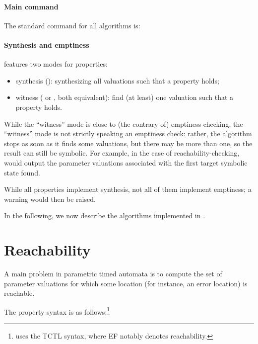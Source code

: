 \paragraph{Main command}
The standard \imitator{} command for all algorithms is:


\paragraph{Synthesis and emptiness}
\imitator{} features two modes for properties:

\begin{itemize}
	\item synthesis (): synthesizing all valuations such that a property holds;
	\item witness ( or , both equivalent): find (at least) one valuation such that a property holds.
\end{itemize}

While the ``witness'' mode is close to (the contrary of) emptiness-checking, the ``witness'' mode is not strictly speaking an emptiness check: rather, the algorithm stops as soon as it finds some valuations, but there may be more than one, so the result can still be symbolic.
For example, in the case of reachability-checking, \imitator{} would output the parameter valuations associated with the first target symbolic state found.


While all properties implement synthesis, not all of them implement emptiness; a warning would then be raised.

In the following, we now describe the algorithms implemented in \imitator{}.

\section{Reachability}\label{ss:mode:EFsynth}

A main problem in parametric timed automata is to compute the set of parameter valuations for which some location (for instance, an error location) is reachable.

The property syntax is as follows:\footnote{%
	\imitator{} uses the TCTL syntax, where EF notably denotes reachability.
}

